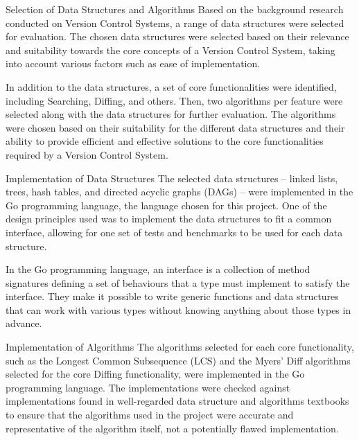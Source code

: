 \documentclass[a4paper,12pt]{article}
\makeatletter
\renewcommand{\subsection}{\needspace{.15\textheight} \@startsection{subsection}{1}{0mm}
  {\baselineskip}
  {\baselineskip}{\large\bfseries\scshape}}
\makeatother
\begin{document}
\subsection{Selection of Data Structures and Algorithms}
Based on the background research conducted on Version Control Systems, a range of data structures were selected for evaluation. The chosen data structures were selected based on their relevance and suitability towards the core concepts of a Version Control System, taking into account various factors such as ease of implementation.
\vspace{9pt}

In addition to the data structures, a set of core functionalities were identified, including Searching, Diffing, and others. Then, two algorithms per feature were selected along with the data structures for further evaluation. The algorithms were chosen based on their suitability for the different data structures and their ability to provide efficient and effective solutions to the core functionalities required by a Version Control System.

\subsection{Implementation of Data Structures}
The selected data structures – linked lists, trees, hash tables, and directed acyclic graphs (DAGs) – were implemented in the Go programming language, the language chosen for this project. One of the design principles used was to implement the data structures to fit a common interface, allowing for one set of tests and benchmarks to be used for each data structure.
\vspace{9pt}

In the Go programming language, an interface is a collection of method signatures defining a set of behaviours that a type must implement to satisfy the interface. They make it possible to write generic functions and data structures that can work with various types without knowing anything about those types in advance.

\subsection{Implementation of Algorithms}
The algorithms selected for each core functionality, such as the Longest Common Subsequence (LCS) and the Myers' Diff algorithms selected for the core Diffing functionality, were implemented in the Go programming language. The implementations were checked against implementations found in well-regarded data structure and algorithms textbooks to ensure that the algorithms used in the project were accurate and representative of the algorithm itself, not a potentially flawed implementation.
\vspace{9pt}
\end{document}
